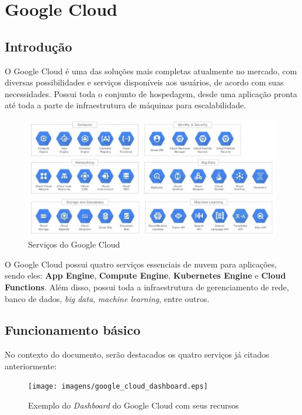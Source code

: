 \chapter{Google Cloud}

\section{Introdução}
O Google Cloud é uma das soluções mais completas atualmente no mercado, com diversas possibilidades e serviços disponíveis aos usuários, de acordo com suas necessidades. Possui toda o conjunto de hospedagem, desde uma aplicação pronta até toda a parte de infraestrutura de máquinas para escalabilidade.

\begin{figure}[h!]
  \centering
  \includegraphics[scale=0.75]{imagens/google_cloud_services.eps}
  \caption{Serviços do Google Cloud\cite{googlecloudservices}}
\end{figure}

O Google Cloud possui quatro serviços essenciais de nuvem para aplicações, sendo eles: \textbf{App Engine}, \textbf{Compute Engine}, \textbf{Kubernetes Engine} e \textbf{Cloud Functions}. Além disso, possui toda a infraestrutura de gerenciamento de rede, banco de dados, \textit{big data}, \textit{machine learning}, entre outros.

\section{Funcionamento básico}

No contexto do documento, serão destacados os quatro serviços já citados anteriormente:

\begin{figure}[h!]
  \centering
  \texttt{[image: imagens/google\_cloud\_dashboard.eps]}
  \caption{Exemplo do \textit{Dashboard} do Google Cloud com seus recursos}
\end{figure}

